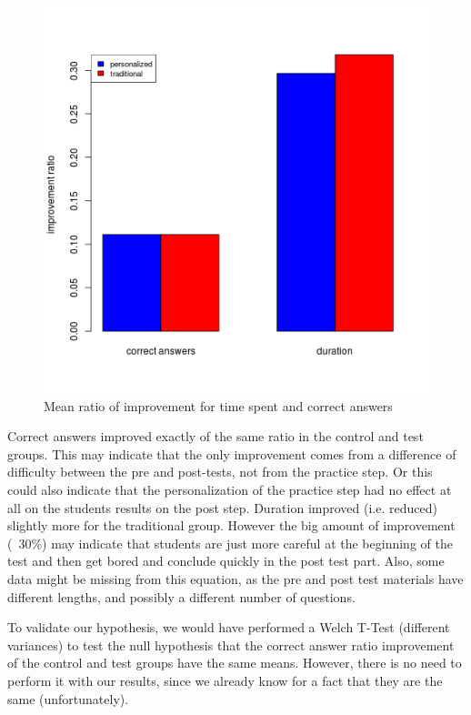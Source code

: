 \documentclass[a4paper,12pt]{article}
\makeatletter
\def\maxwidth{%
  \ifdim\Gin@nat@width>\linewidth
    \linewidth
  \else
    \Gin@nat@width
  \fi
}
\makeatother
\begin{document}
\begin{figure}[H]
\begin{center}
\includegraphics[width=\maxwidth]{improvements.png}
\caption{Mean ratio of improvement for time spent and correct answers}
\label{improvements}
\end{center}
\end{figure}

Correct answers improved exactly of the same ratio in the control and test groups. This may indicate that the only improvement comes from a difference of difficulty between the pre and post-tests, not from the practice step. Or this could also indicate that the personalization of the practice step had no effect at all on the students results on the post step.
Duration improved (i.e. reduced) slightly more for the traditional group. However the big amount of improvement (~30\%) may indicate that students are just more careful at the beginning of the test and then get bored and conclude quickly in the post test part. Also, some data might be missing from this equation, as the pre and post test materials have different lengths, and possibly a different number of questions.

To validate our hypothesis, we would have performed a Welch T-Test (different variances) to test the null hypothesis that the correct answer ratio improvement of the control and test groups have the same means. However, there is no need to perform it with our results, since we already know for a fact that they are the same (unfortunately).
\end{document}
